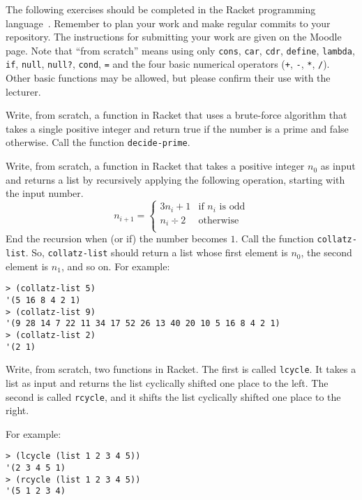 \documentclass[a4paper, 12pt]{exam}
\begin{document}
\noindent
The following exercises should be completed in the Racket programming language~\cite{racketwebsite}.
Remember to plan your work and make regular commits to your repository.
The instructions for submitting your work are given on the Moodle page.
Note that ``from scratch'' means using only \texttt{cons}, \texttt{car}, \texttt{cdr}, \texttt{define}, \texttt{lambda}, \texttt{if}, \texttt{null}, \texttt{null?}, \texttt{cond}, \texttt{=} and the four basic numerical operators (\texttt{+}, \texttt{-}, \texttt{*}, \texttt{/}).
Other basic functions may be allowed, but please confirm their use with the lecturer.

\begin{questions}

\question
Write, from scratch, a function in Racket that uses a brute-force algorithm that takes a single positive integer and return true if the number is a prime and false otherwise. Call the function \texttt{decide-prime}.


\question
Write, from scratch, a function in Racket that takes a positive integer $n_0$ as input and returns a list by recursively applying the following operation, starting with the input number.
$$
n_{i+1} =
\left\{
  \begin{array}{ll}
    3n_i + 1 & \textrm{if } n_i \textrm{ is odd}  \\
		n_i \div 2 & \textrm{otherwise} \\
	\end{array}
\right.
$$
End the recursion when (or if) the number becomes $1$.
Call the function \texttt{collatz-list}.
So, \texttt{collatz-list} should return a list whose first element is $n_0$, the second element is $n_1$, and so on.
For example:
\begin{verbatim}
> (collatz-list 5)
'(5 16 8 4 2 1)
> (collatz-list 9)
'(9 28 14 7 22 11 34 17 52 26 13 40 20 10 5 16 8 4 2 1)
> (collatz-list 2)
'(2 1)
\end{verbatim}


\question
Write, from scratch, two functions in Racket.
The first is called \texttt{lcycle}.
It takes a list as input and returns the list cyclically shifted one place to the left.
The second is called \texttt{rcycle}, and it shifts the list cyclically shifted one place to the right.

For example:
\begin{verbatim}
> (lcycle (list 1 2 3 4 5))
'(2 3 4 5 1)
> (rcycle (list 1 2 3 4 5))
'(5 1 2 3 4)
\end{verbatim}


\end{questions}



\end{document}
